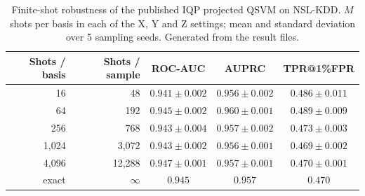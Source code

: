 \begin{table}[t]
\centering
\caption{Finite-shot robustness of the published IQP projected QSVM on NSL-KDD. $M$ shots per basis in
each of the X, Y and Z settings; mean and standard deviation over 5 sampling seeds. Generated from the
result files.}
\label{tab:shots}
\footnotesize
\renewcommand{\arraystretch}{1.15}
\setlength{\tabcolsep}{6pt}
\begin{tabular}{@{}rrccc@{}}
\toprule
\textbf{Shots / basis} & \textbf{Shots / sample} & \textbf{ROC-AUC} & \textbf{AUPRC} & \textbf{TPR@1\%FPR}\\
\midrule
16 & 48 & $0.941\pm0.002$ & $0.956\pm0.002$ & $0.486\pm0.011$\\
64 & 192 & $0.945\pm0.002$ & $0.960\pm0.001$ & $0.489\pm0.009$\\
256 & 768 & $0.943\pm0.004$ & $0.957\pm0.002$ & $0.473\pm0.003$\\
1{,}024 & 3{,}072 & $0.943\pm0.002$ & $0.956\pm0.001$ & $0.469\pm0.002$\\
4{,}096 & 12{,}288 & $0.947\pm0.001$ & $0.957\pm0.001$ & $0.470\pm0.001$\\
\addlinespace[2pt]
exact & $\infty$ & $0.945$ & $0.957$ & $0.470$\\
\bottomrule
\end{tabular}
\end{table}
